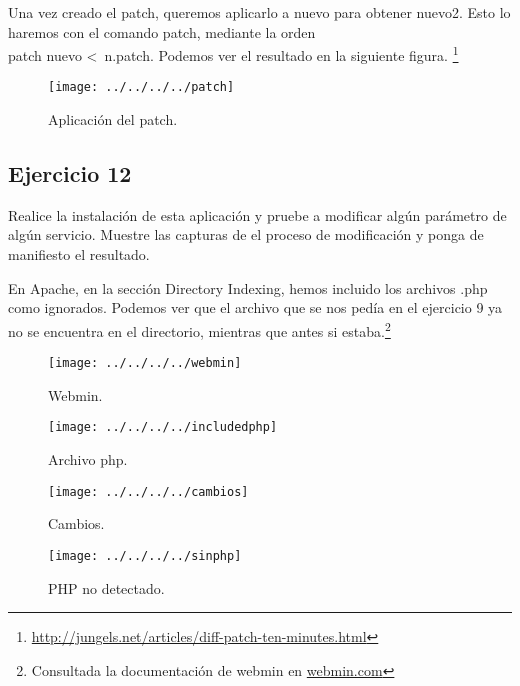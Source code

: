 \documentclass[a4paper, 11pt]{article} %
\begin{document}
\pagebreak

Una vez creado el patch, queremos aplicarlo a nuevo para obtener nuevo2. Esto lo haremos con el comando patch, mediante la orden\\ patch nuevo <\ n.patch. Podemos ver el resultado en la siguiente figura. \footnote{\url{http://jungels.net/articles/diff-patch-ten-minutes.html}}

\begin{figure}[htpb]
\texttt{[image: ../../../../patch]}
\caption{Aplicación del patch.}
\end{figure}


\subsection{Ejercicio 12}
Realice la instalación de esta aplicación y pruebe a modificar algún parámetro de algún servicio. Muestre las capturas de el proceso de modificación y ponga de manifiesto el resultado.

En Apache, en la sección Directory Indexing, hemos incluido los archivos .php como ignorados. Podemos ver que el archivo que se nos pedía en el ejercicio 9 ya no se encuentra en el directorio, mientras que antes si estaba.\footnote{Consultada la documentación de webmin en \url{webmin.com}}

\begin{figure}[htpb]
\texttt{[image: ../../../../webmin]}
\caption{Webmin.}
\end{figure}

\pagebreak

\begin{figure}[htpb]
\texttt{[image: ../../../../includedphp]}
\caption{Archivo php.}
\end{figure}

\pagebreak

\begin{figure}[htpb]
\texttt{[image: ../../../../cambios]}
\caption{Cambios.}
\end{figure}


\pagebreak

\begin{figure}[htpb]
\texttt{[image: ../../../../sinphp]}
\caption{PHP no detectado.}
\end{figure}

\pagebreak
\end{document}

